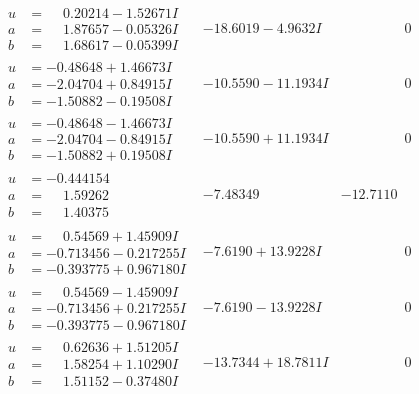 \documentclass[1p]{elsarticle_modified}
\theoremstyle{definition}
\begin{document}
$$\begin{array}{c|c|c}
\begin{aligned}
u &= \phantom{-}0.20214 - 1.52671 I \\
a &= \phantom{-}1.87657 - 0.05326 I \\
b &= \phantom{-}1.68617 - 0.05399 I\end{aligned}
 & -18.6019 - 4.9632 I & \phantom{-0.000000 } 0 \\ \hline\begin{aligned}
u &= -0.48648 + 1.46673 I \\
a &= -2.04704 + 0.84915 I \\
b &= -1.50882 - 0.19508 I\end{aligned}
 & -10.5590 - 11.1934 I & \phantom{-0.000000 } 0 \\ \hline\begin{aligned}
u &= -0.48648 - 1.46673 I \\
a &= -2.04704 - 0.84915 I \\
b &= -1.50882 + 0.19508 I\end{aligned}
 & -10.5590 + 11.1934 I & \phantom{-0.000000 } 0 \\ \hline\begin{aligned}
u &= -0.444154\phantom{ +0.000000I} \\
a &= \phantom{-}1.59262\phantom{ +0.000000I} \\
b &= \phantom{-}1.40375\phantom{ +0.000000I}\end{aligned}
 & -7.48349\phantom{ +0.000000I} & -12.7110\phantom{ +0.000000I} \\ \hline\begin{aligned}
u &= \phantom{-}0.54569 + 1.45909 I \\
a &= -0.713456 - 0.217255 I \\
b &= -0.393775 + 0.967180 I\end{aligned}
 & -7.6190 + 13.9228 I & \phantom{-0.000000 } 0 \\ \hline\begin{aligned}
u &= \phantom{-}0.54569 - 1.45909 I \\
a &= -0.713456 + 0.217255 I \\
b &= -0.393775 - 0.967180 I\end{aligned}
 & -7.6190 - 13.9228 I & \phantom{-0.000000 } 0 \\ \hline\begin{aligned}
u &= \phantom{-}0.62636 + 1.51205 I \\
a &= \phantom{-}1.58254 + 1.10290 I \\
b &= \phantom{-}1.51152 - 0.37480 I\end{aligned}
 & -13.7344 + 18.7811 I & \phantom{-0.000000 } 0 \\ \hline\begin{aligned}

\end{aligned}
\end{array}$$
\end{document}
